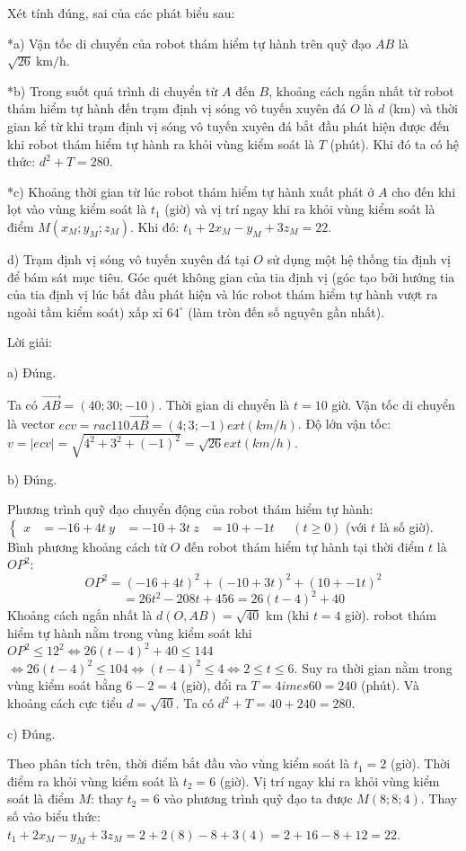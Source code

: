 \documentclass[a4paper,12pt]{article}
\newcommand{\heva}[1]{\left\{\begin{aligned}#1\end{aligned}\right.}
\begin{document}
Xét tính đúng, sai của các phát biểu sau:

*a) Vận tốc di chuyển của robot thám hiểm tự hành trên quỹ đạo $AB$ là $\sqrt{26} \mathrm{~km/h}$.

*b) Trong suốt quá trình di chuyển từ $A$ đến $B$, khoảng cách ngắn nhất từ robot thám hiểm tự hành đến trạm định vị sóng vô tuyến xuyên đá $O$ là $d$ (km) và thời gian kể từ khi trạm định vị sóng vô tuyến xuyên đá bắt đầu phát hiện được đến khi robot thám hiểm tự hành ra khỏi vùng kiểm soát là $T$ (phút). Khi đó ta có hệ thức: $d^2 + T = 280$.

*c) Khoảng thời gian từ lúc robot thám hiểm tự hành xuất phát ở $A$ cho đến khi lọt vào vùng kiểm soát là $t_1$ (giờ) và vị trí ngay khi ra khỏi vùng kiểm soát là điểm $M(x_M; y_M; z_M)$. Khi đó: $t_1 + 2x_M - y_M + 3z_M = 22$.

d) Trạm định vị sóng vô tuyến xuyên đá tại $O$ sử dụng một hệ thống tia định vị để bám sát mục tiêu. Góc quét không gian của tia định vị (góc tạo bởi hướng tia của tia định vị lúc bắt đầu phát hiện và lúc robot thám hiểm tự hành vượt ra ngoài tầm kiểm soát) xấp xỉ $64^{\circ}$ (làm tròn đến số nguyên gần nhất).

Lời giải:

a) Đúng.

Ta có $\overrightarrow{AB} = (40; 30; -10) $. Thời gian di chuyển là $t = 10$ giờ.
Vận tốc di chuyển là vector $ec{v} = rac{1}{10} \overrightarrow{AB} = (4; 3; -1) 	ext{ (km/h)}$.
Độ lớn vận tốc: $v = |ec{v}| = \sqrt{4^2 + 3^2 + (-1)^2} = \sqrt{26} 	ext{ (km/h)}$.

b) Đúng.

Phương trình quỹ đạo chuyển động của robot thám hiểm tự hành: $\heva{x &= -16 + 4t \ y &= -10 + 3t \ z &= 10 + -1t} \quad (t \ge 0)$ (với $t$ là số giờ).
Bình phương khoảng cách từ $O$ đến robot thám hiểm tự hành tại thời điểm $t$ là $OP^2$:
$$OP^2 = (-16 + 4t)^2 + (-10 + 3t)^2 + (10 + -1t)^2$$
$$= 26t^2 - 208t + 456 = 26(t - 4)^2 + 40$$
Khoảng cách ngắn nhất là $d(O, AB) = \sqrt{40}$ km (khi $t = 4$ giờ).
robot thám hiểm tự hành nằm trong vùng kiểm soát khi $OP^2 \le 12^2 \iff 26(t - 4)^2 + 40 \le 144$
$\iff 26(t - 4)^2 \le 104 \iff (t - 4)^2 \le 4 \iff 2 \le t \le 6$.
Suy ra thời gian nằm trong vùng kiểm soát bằng $6 - 2 = 4$ (giờ), đổi ra $T = 4 	imes 60 = 240$ (phút).
Và khoảng cách cực tiểu $d = \sqrt{40}$.
Ta có  $d^2 + T = 40 + 240 = 280$.

c) Đúng.

Theo phân tích trên, thời điểm bắt đầu vào vùng kiểm soát là $t_1 = 2$ (giờ).
Thời điểm ra khỏi vùng kiểm soát là $t_2 = 6$ (giờ).
Vị trí ngay khi ra khỏi vùng kiểm soát là điểm $M$: thay $t_2 = 6$ vào phương trình quỹ đạo ta được $M(8; 8; 4)$.
Thay số vào biểu thức: $t_1 + 2x_M - y_M + 3z_M = 2 + 2(8) - 8 + 3(4) = 2 + 16 - 8 + 12 = 22$.
\end{document}
